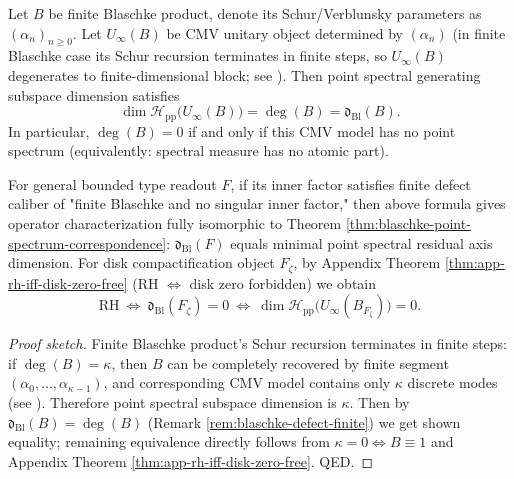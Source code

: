 \begin{corollary}\label{cor:xi-cmv-point-spectrum-dimension-equals-blaschke-degree}
Let \(B\) be finite Blaschke product, denote its Schur/Verblunsky parameters as \((\alpha_n)_{n\ge 0}\).
Let \(U_\infty(B)\) be CMV unitary object determined by \((\alpha_n)\) (in finite Blaschke case its Schur recursion terminates in finite steps, so \(U_\infty(B)\) degenerates to finite-dimensional block; see \cite{Simon2005OPUC1}).
Then point spectral generating subspace dimension satisfies
\[
\boxed{\;\dim\mathcal H_{\mathrm{pp}}\!\bigl(U_\infty(B)\bigr)=\deg(B)=\mathfrak d_{\mathrm{Bl}}(B).\;}
\]
In particular, \(\deg(B)=0\) if and only if this CMV model has no point spectrum (equivalently: spectral measure has no atomic part).
\par
For general bounded type readout \(F\), if its inner factor satisfies finite defect caliber of "finite Blaschke and no singular inner factor," then above formula gives operator characterization fully isomorphic to Theorem \ref{thm:blaschke-point-spectrum-correspondence}: \(\mathfrak d_{\mathrm{Bl}}(F)\) equals minimal point spectral residual axis dimension.
For disk compactification object \(F_\zeta\), by Appendix Theorem \ref{thm:app-rh-iff-disk-zero-free} (RH \(\Longleftrightarrow\) disk zero forbidden) we obtain
\[
\mathrm{RH}
\ \Longleftrightarrow\
\mathfrak d_{\mathrm{Bl}}(F_\zeta)=0
\ \Longleftrightarrow\
\dim\mathcal H_{\mathrm{pp}}\!\bigl(U_\infty(B_{F_\zeta})\bigr)=0.
\]
\end{corollary}

\begin{proof}[Proof sketch]
Finite Blaschke product's Schur recursion terminates in finite steps: if \(\deg(B)=\kappa\), then \(B\) can be completely recovered by finite segment \((\alpha_0,\dots,\alpha_{\kappa-1})\), and corresponding CMV model contains only \(\kappa\) discrete modes (see \cite{Simon2005OPUC1}).
Therefore point spectral subspace dimension is \(\kappa\).
Then by \(\mathfrak d_{\mathrm{Bl}}(B)=\deg(B)\) (Remark \ref{rem:blaschke-defect-finite}) we get shown equality; remaining equivalence directly follows from \(\kappa=0\iff B\equiv 1\) and Appendix Theorem \ref{thm:app-rh-iff-disk-zero-free}. QED.
\end{proof}

